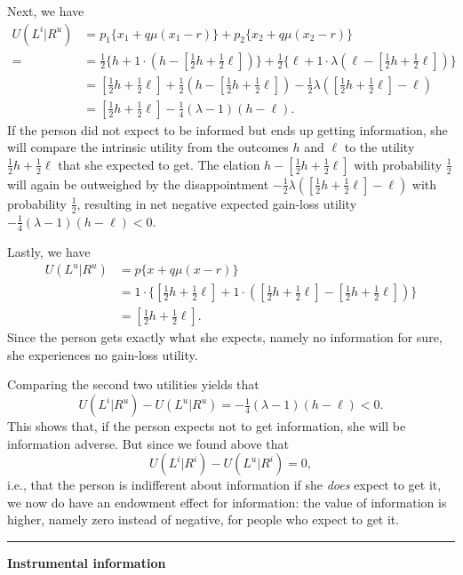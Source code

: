 \documentclass[11pt,reqno]{amsart}
\newcommand{\half}{\tfrac{1}{2}}
\newcommand{\qrtr}{\tfrac{1}{4}}
\newcommand{\brk}{\vspace*{0.8em}\hrule}
\begin{document}
Next, we have
\begin{align*}
  U(L^i|R^u) 
&= p_1\bigl\{x_1 + q\mu(x_1 - r)\bigr\}
 + p_2\bigl\{x_2 + q\mu(x_2 - r)\bigr\}\\=
&= \half\bigl\{h + 1\cdot(h - [\half h + \half\ell])\bigr\}
 + \half\bigl\{\ell + 1\cdot\lambda(\ell - [\half h + \half\ell])\bigr\}\\
&= [\half h + \half \ell] + 
\half(h-[\half h + \half \ell]) - \half \lambda([\half h + \half\ell] - \ell)\\
&= [\half h + \half \ell] - \qrtr(\lambda-1)(h - \ell).
\end{align*}
If the person did not expect to be informed but ends up getting information,
she will compare the intrinsic utility from the outcomes $h$ and $\ell$ to the
utility $\half h + \half \ell$ that she expected to get. The elation $h -
[\half h + \half \ell]$ with probability $\half$ will again be outweighed by
the disappointment $ - \half \lambda([\half h + \half\ell] - \ell)$ with
probability $\half$, resulting in net negative expected gain-loss utility
$-\qrtr(\lambda - 1)(h - \ell) < 0$.

Lastly, we have
\begin{align*}
  U(L^u|R^u) 
&= p\bigl\{x + q\mu(x - r)\bigr\}
\\
&= 1\cdot\bigl\{[\half h + \half \ell] + 1\cdot([\half h + \half \ell] - [\half
h + \half \ell])\bigr\}\\
&= [\half h + \half \ell].
\end{align*}
Since the person gets exactly what she expects, namely no information for
sure, she experiences no gain-loss utility.

Comparing the second two utilities yields that
\begin{equation*}
  U(L^i|R^u) - U(L^u|R^u) = -\qrtr(\lambda-1)(h-\ell) < 0.
\end{equation*}
This shows that, if the person expects not to get information, she will be
information adverse. But since we found above that
\begin{equation*}
  U(L^i|R^i) - U(L^u|R^i) = 0,
\end{equation*}
i.e., that the person is indifferent about information if she {\em does} expect
to get it, we now do have an endowment effect for information: the value of
information is higher, namely zero instead of negative, for people who expect
to get it. 

\brk

\begin{center}
\textbf{Instrumental information}
\end{center}
\end{document}
